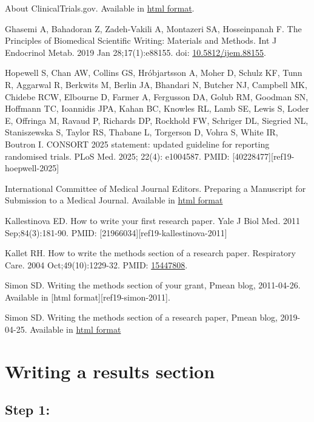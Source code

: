 \documentclass[
  letterpaper,
  DIV=11,
  numbers=noendperiod]{scrreprt}
\begin{document}
\begin{tcolorbox}
About ClinicalTrials.gov. Available in
\href{https://clinicaltrials.gov/about-site/about-ctg}{html format}.

Ghasemi A, Bahadoran Z, Zadeh-Vakili A, Montazeri SA, Hosseinpanah F.
The Principles of Biomedical Scientific Writing: Materials and Methods.
Int J Endocrinol Metab. 2019 Jan 28;17(1):e88155. doi:
\href{https://doi.org/10.5812/ijem.88155}{10.5812/ijem.88155}.

Hopewell S, Chan AW, Collins GS, Hróbjartsson A, Moher D, Schulz KF,
Tunn R, Aggarwal R, Berkwits M, Berlin JA, Bhandari N, Butcher NJ,
Campbell MK, Chidebe RCW, Elbourne D, Farmer A, Fergusson DA, Golub RM,
Goodman SN, Hoffmann TC, Ioannidis JPA, Kahan BC, Knowles RL, Lamb SE,
Lewis S, Loder E, Offringa M, Ravaud P, Richards DP, Rockhold FW,
Schriger DL, Siegried NL, Staniszewska S, Taylor RS, Thabane L,
Torgerson D, Vohra S, White IR, Boutron I. CONSORT 2025 statement:
updated guideline for reporting randomised trials. PLoS Med. 2025;
22(4): e1004587. PMID: {[}40228477{]}{[}ref19-hoepwell-2025{]}

International Committee of Medical Journal Editors. Preparing a
Manuscript for Submission to a Medical Journal. Available in
\href{https://icmje.org/recommendations/browse/manuscript-preparation/preparing-for-submission.html}{html
format}

Kallestinova ED. How to write your first research paper. Yale J Biol
Med. 2011 Sep;84(3):181-90. PMID:
{[}21966034{]}{[}ref19-kallestinova-2011{]}

Kallet RH. How to write the methods section of a research paper.
Respiratory Care. 2004 Oct;49(10):1229-32. PMID:
\href{https://pubmed.ncbi.nlm.nih.gov/15447808/}{15447808}.

Simon SD. Writing the methods section of your grant, Pmean blog,
2011-04-26. Available in {[}html format{]}{[}ref19-simon-2011{]}.

Simon SD. Writing the methods section of a research paper, Pmean blog,
2019-04-25. Available in
\href{http://pmean.com/posts/writing-methods-section/}{html format}


\chapter{Writing a results section}\label{writing-a-results-section}

\section{Step 1:}\label{step-1}


\end{tcolorbox}
\end{document}
